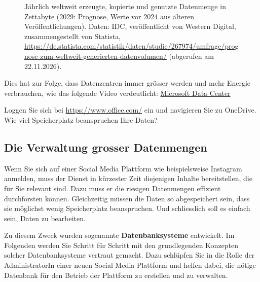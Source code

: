 \begin{figure}[H]
  \centering
  
  \caption[Entwicklung der weltweiten Datenmenge]{Jährlich weltweit erzeugte, kopierte und genutzte Datenmenge in Zettabyte (2029: Prognose, Werte vor 2024 aus älteren Veröffentlichungen). Daten: IDC, veröffentlicht von Western Digital, zusammengestellt von Statista, \url{https://de.statista.com/statistik/daten/studie/267974/umfrage/prognose-zum-weltweit-generierten-datenvolumen/} (abgerufen am 22.11.2026).}
  \label{fig:daten-global}
\end{figure}

Dies hat zur Folge, dass Datenzentren immer grösser werden und mehr Energie verbrauchen, wie das folgende Video
verdeutlicht: \href{https://www.nanoo.tv/link/v/KjMdjjgC}{Microsoft Data Center}

\begin{myexercise}
  Loggen Sie sich bei \url{https://www.office.com/} ein und navigieren Sie zu OneDrive. Wie viel Speicherplatz beanspruchen Ihre Daten?
\end{myexercise}





\subsection{Die Verwaltung grosser Datenmengen}\label{subsec:Verwaltung}

Wenn Sie sich auf einer Social Media Plattform wie beispielsweise Instagram anmelden, muss der Dienst in kürzester Zeit diejenigen Inhalte bereitstellen, die für Sie relevant sind. Dazu muss er die riesigen Datenmengen effizient durchforsten können. Gleichzeitig müssen die Daten so abgespeichert sein, dass sie möglichst wenig Speicherplatz beanspruchen. Und schliesslich soll es einfach sein, Daten zu bearbeiten.

Zu diesem Zweck wurden sogenannte \textbf{Datenbanksysteme} entwickelt. Im Folgenden werden Sie Schritt für Schritt mit den grundlegenden Konzepten solcher Datenbanksysteme vertraut gemacht. Dazu schlüpfen Sie in die Rolle der AdministratorIn einer neuen Social Media Plattform und helfen dabei, die nötige Datenbank für den Betrieb der Plattform zu erstellen und zu verwalten.


